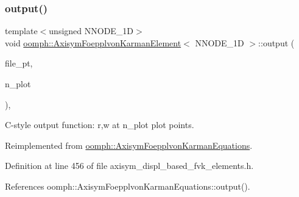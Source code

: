 \subsubsection{\texorpdfstring{output()}{output()}\hspace{0.1cm}{\footnotesize\ttfamily [8/8]}}
{\footnotesize\ttfamily template$<$unsigned N\+N\+O\+D\+E\+\_\+1D$>$ \\
void \hyperlink{classoomph_1_1AxisymFoepplvonKarmanElement}{oomph\+::\+Axisym\+Foepplvon\+Karman\+Element}$<$ N\+N\+O\+D\+E\+\_\+1D $>$\+::output (\begin{DoxyParamCaption}\item[{F\+I\+LE $\ast$}]{file\+\_\+pt,  }\item[{const unsigned \&}]{n\+\_\+plot }\end{DoxyParamCaption})\hspace{0.3cm}{\ttfamily [inline]}, {\ttfamily [virtual]}}



C-\/style output function\+: r,w at n\+\_\+plot plot points. 



Reimplemented from \hyperlink{classoomph_1_1AxisymFoepplvonKarmanEquations_a5278f37c336b7a4bd2931fdedd2945f8}{oomph\+::\+Axisym\+Foepplvon\+Karman\+Equations}.



Definition at line 456 of file axisym\+\_\+displ\+\_\+based\+\_\+fvk\+\_\+elements.\+h.



References oomph\+::\+Axisym\+Foepplvon\+Karman\+Equations\+::output().

\mbox{\label{classoomph_1_1AxisymFoepplvonKarmanElement_aee745c3439aa18c82ddbe8b90fade1c0}} 
